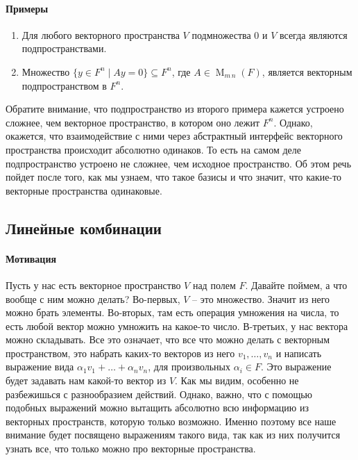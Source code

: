 \paragraph{Примеры}
\begin{enumerate}
\item Для любого векторного пространства $V$ подмножества $0$ и $V$ всегда являются подпространствами.

\item Множество $\{y\in F^n \mid Ay = 0\}\subseteq F^n$, где $A\in\operatorname{M}_{m\,n}(F)$, является векторным подпространством в $F^n$.
\end{enumerate}

Обратите внимание, что подпространство из второго примера кажется устроено сложнее, чем векторное пространство, в котором оно лежит $F^n$.
Однако, окажется, что взаимодействие с ними через абстрактный интерфейс векторного пространства происходит абсолютно одинаков.
То есть на самом деле подпространство устроено не сложнее, чем исходное пространство.
Об этом речь пойдет после того, как мы узнаем, что такое базисы и что значит, что какие-то векторные пространства одинаковые.

\subsection{Линейные комбинации}

\paragraph{Мотивация}
Пусть у нас есть векторное пространство $V$ над полем $F$.
Давайте поймем, а что вообще с ним можно делать?
Во-первых, $V$ -- это множество.
Значит из него можно брать элементы.
Во-вторых, там есть операция умножения на числа, то есть любой вектор можно умножить на какое-то число.
В-третьих, у нас вектора можно складывать.
Все это означает, что все что можно делать с векторным пространством, это набрать каких-то векторов из него $v_1,\ldots,v_n$ и написать выражение вида $\alpha_1 v_1 + \ldots + \alpha_n v_n$, для произвольных $\alpha_i\in F$.
Это выражение будет задавать нам какой-то вектор из $V$.
Как мы видим, особенно не разбежишься с разнообразием действий.
Однако, важно, что с помощью подобных выражений можно вытащить абсолютно всю информацию из векторных пространств, которую только возможно.
Именно поэтому все наше внимание будет посвящено выражениям такого вида, так как из них получится узнать все, что только можно про векторные пространства.

